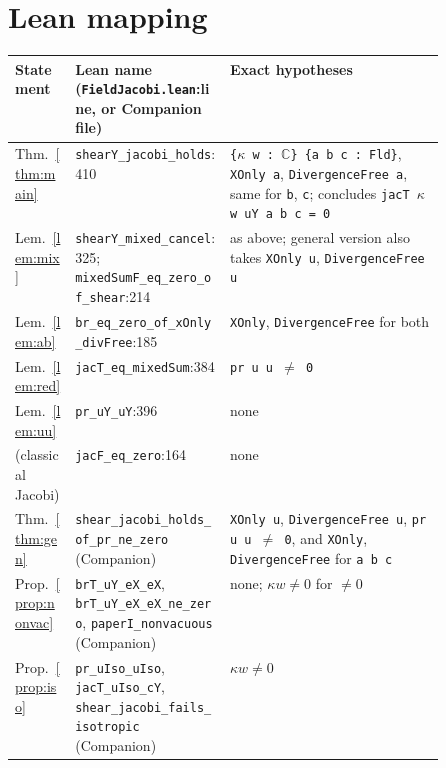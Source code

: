 \documentclass[11pt]{article}\emergencystretch=2em
\theoremstyle{definition}\newtheorem{definition}[theorem]{Definition}\theoremstyle{remark}\newtheorem{remark}[theorem]{Remark}
\begin{document}
\section{Lean mapping}
\small\begin{tabularx}{\linewidth}{@{}>{\raggedright}p{0.14\linewidth}>{\raggedright}p{0.36\linewidth}>{\raggedright\arraybackslash}X@{}}\toprule
Statement & Lean name (\texttt{FieldJacobi.lean}:line, or Companion file) & Exact hypotheses\\\midrule
Thm.~\ref{thm:main} & \texttt{shearY\_jacobi\_holds}:410 & \texttt{\{$\kappa$ w : $\mathbb{C}$\} \{a b c : Fld\}}, \texttt{XOnly a}, \texttt{DivergenceFree a}, same for \texttt{b}, \texttt{c}; concludes \texttt{jacT $\kappa$ w uY a b c = 0}\\
Lem.~\ref{lem:mix} & \texttt{shearY\_mixed\_cancel}:325; \texttt{mixedSumF\_eq\_zero\_of\_shear}:214 & as above; general version also takes \texttt{XOnly u}, \texttt{DivergenceFree u}\\
Lem.~\ref{lem:ab} & \texttt{br\_eq\_zero\_of\_xOnly\_divFree}:185 & \texttt{XOnly}, \texttt{DivergenceFree} for both\\
Lem.~\ref{lem:red} & \texttt{jacT\_eq\_mixedSum}:384 & \texttt{pr u u $\ne$ 0}\\
Lem.~\ref{lem:uu} & \texttt{pr\_uY\_uY}:396 & none\\
(classical Jacobi) & \texttt{jacF\_eq\_zero}:164 & none\\
Thm.~\ref{thm:gen} & \texttt{shear\_jacobi\_holds\_of\_pr\_ne\_zero} (Companion) & \texttt{XOnly u}, \texttt{DivergenceFree u}, \texttt{pr u u $\ne$ 0}, and \texttt{XOnly}, \texttt{DivergenceFree} for \texttt{a b c}\\
Prop.~\ref{prop:nonvac} & \texttt{brT\_uY\_eX\_eX}, \texttt{brT\_uY\_eX\_eX\_ne\_zero}, \texttt{paperI\_nonvacuous} (Companion) & none; $\kappa w\ne0$ for $\ne0$\\
Prop.~\ref{prop:iso} & \texttt{pr\_uIso\_uIso}, \texttt{jacT\_uIso\_cY}, \texttt{shear\_jacobi\_fails\_isotropic} (Companion) & $\kappa w\ne0$\\
\bottomrule\end{tabularx}\normalsize
\end{document}
